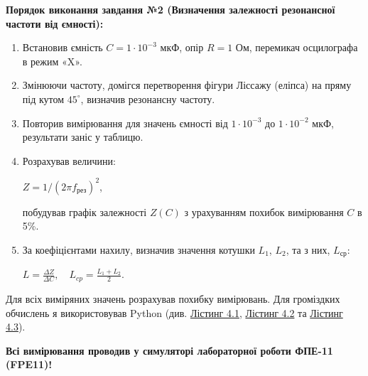 \documentclass[12pt,a4paper]{article}
\begin{document}
    \textbf{Порядок виконання завдання №2 (Визначення залежності резонансної частоти від ємності):}

    \begin{enumerate}

        \item Встановив ємність $C = 1\cdot10^{-3}$ мкФ, опір $R = 1$ Ом, перемикач осцилографа в режим «X».
    
        \item Змінюючи частоту, домігся перетворення фігури Ліссажу (еліпса) на пряму під кутом $45^{\circ}$, визначив резонансну частоту.
    
        \item Повторив вимірювання для значень ємності від $1\cdot10^{-3}$ до $1\cdot10^{-2}$ мкФ, результати заніс у таблицю.
    
        \item Розрахував величини:

        \vspace{-0.5em}

        \begin{center}
            $\displaystyle Z = 1/(2\pi f_{\text{рез}})^2$,
        \end{center}

        \vspace{-0.5em}

        побудував графік залежності $Z(C)$ з урахуванням похибок вимірювання $C$ в 5\%.
    
        \item За коефіцієнтами нахилу, визначив значення котушки $L_1$, $L_2$, та з них, $L_{\text{ср}}$:

        \begin{center}
            $\displaystyle L = \frac{\Delta Z}{\Delta C}, \quad L_{cp} = \frac{L_1 + L_2}{2}$.
        \end{center}

    \end{enumerate}

    Для всіх виміряних значень розрахував похибку вимірювань. Для громіздких обчислень я використовував Python
    (див. \hyperlink{listing1}{Лістинг 4.1}, \hyperlink{listing2}{Лістинг 4.2} та \hyperlink{listing3}{Лістинг 4.3}).

    \textbf{Всі вимірювання проводив у симуляторі лабораторної роботи ФПЕ-11 (FPE11)!}
\end{document}
